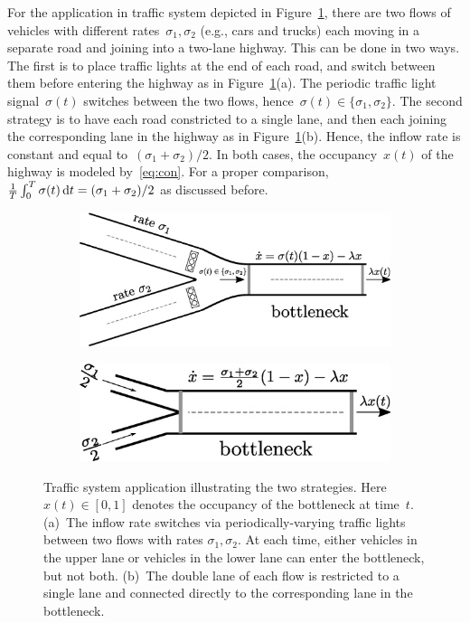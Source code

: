 For the application in traffic system depicted in Figure~\ref{f.traffic}, there are two flows of vehicles with different rates~$\sigma_1,\sigma_2$ (e.g., cars and trucks) each moving in a separate road  and joining into a two-lane highway. 
This can be done in two ways. 
The first is to place traffic lights at the end of each road, and switch between them before entering the highway as in Figure~\ref{f.traffic}(a). 
The periodic traffic light signal~$\sigma(t)$ switches between the two flows, hence~$\sigma(t) \in \{\sigma_1,\sigma_2\}$. 
The second strategy is to have each road  constricted to a single lane, and then each joining the corresponding lane in the highway as in Figure~\ref{f.traffic}(b). 
Hence, the inflow rate is constant and equal to~$ (\sigma_1+\sigma_2)/2$. 
In both cases, the occupancy~$x(t)$ of the highway is modeled  by~\eqref{eq:con}. 
For a proper comparison, $\tfrac 1T \int_0^T \sigma(t) \mathop{}\!\mathrm{d} t =   (\sigma_1+\sigma_2)/2$ as discussed before.
\begin{figure}[t!]
	\centering
	\begin{subfigure}[t]{0.9\textwidth}
		\centering
		\includegraphics[width=\columnwidth]{fig/rfm-traffic-a.eps}
		\caption{}
	\end{subfigure}
	\begin{subfigure}[t]{0.7\textwidth}
		\centering
		\includegraphics[width=\columnwidth]{fig/rfm-traffic-b.eps}
		\caption{}
	\end{subfigure}
	\caption[Traffic system illustration]{Traffic system application illustrating the two strategies.
		Here $x(t) \in[0,1]$  denotes the occupancy of the bottleneck at time~$t$. 
		(a)~The inflow rate switches via periodically-varying traffic lights between two flows with rates $\sigma_1,\sigma_2$. At each time, either vehicles in the upper lane or vehicles in the lower lane can enter the bottleneck, but not both. (b)~The double lane of each flow is restricted to a single lane and connected directly to the corresponding lane in the bottleneck. } 
	\label{f.traffic}
\end{figure}

